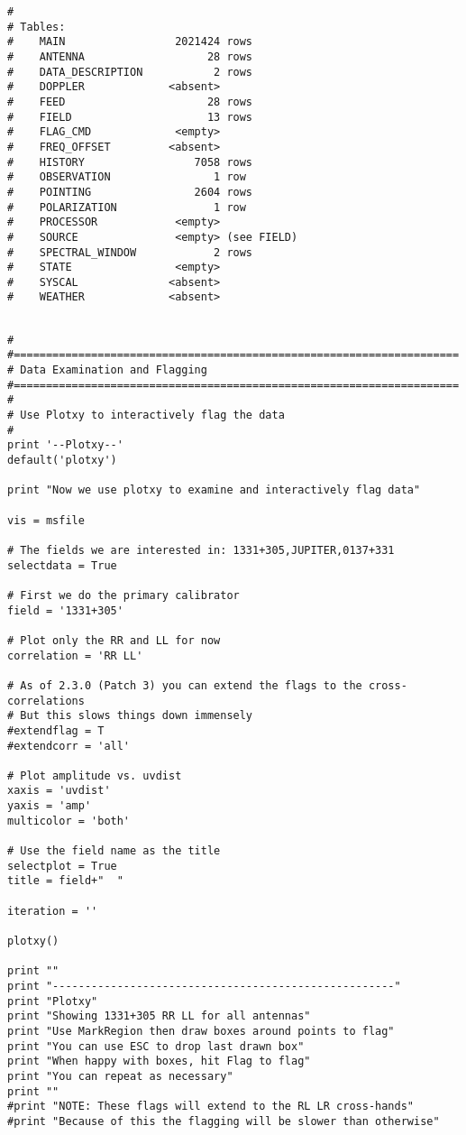 \begin{verbatim}
# 
# Tables:
#    MAIN                 2021424 rows     
#    ANTENNA                   28 rows     
#    DATA_DESCRIPTION           2 rows     
#    DOPPLER             <absent>  
#    FEED                      28 rows     
#    FIELD                     13 rows     
#    FLAG_CMD             <empty>  
#    FREQ_OFFSET         <absent>  
#    HISTORY                 7058 rows     
#    OBSERVATION                1 row      
#    POINTING                2604 rows     
#    POLARIZATION               1 row      
#    PROCESSOR            <empty>  
#    SOURCE               <empty> (see FIELD)
#    SPECTRAL_WINDOW            2 rows     
#    STATE                <empty>  
#    SYSCAL              <absent>  
#    WEATHER             <absent>  
\end{verbatim}
\begin{verbatim}

# 
#=====================================================================
# Data Examination and Flagging
#=====================================================================
# 
# Use Plotxy to interactively flag the data
#
print '--Plotxy--'
default('plotxy')

print "Now we use plotxy to examine and interactively flag data"

vis = msfile

# The fields we are interested in: 1331+305,JUPITER,0137+331
selectdata = True

# First we do the primary calibrator
field = '1331+305'

# Plot only the RR and LL for now
correlation = 'RR LL'

# As of 2.3.0 (Patch 3) you can extend the flags to the cross-correlations
# But this slows things down immensely
#extendflag = T
#extendcorr = 'all'

# Plot amplitude vs. uvdist
xaxis = 'uvdist'
yaxis = 'amp'
multicolor = 'both'

# Use the field name as the title
selectplot = True
title = field+"  "

iteration = ''

plotxy()

print ""
print "-----------------------------------------------------"
print "Plotxy"
print "Showing 1331+305 RR LL for all antennas"
print "Use MarkRegion then draw boxes around points to flag"
print "You can use ESC to drop last drawn box"
print "When happy with boxes, hit Flag to flag"
print "You can repeat as necessary"
print ""
#print "NOTE: These flags will extend to the RL LR cross-hands"
#print "Because of this the flagging will be slower than otherwise"


\end{verbatim}
